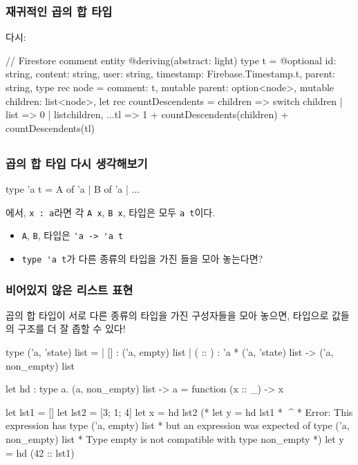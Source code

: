 \documentclass{beamer}
\begin{document}
\begin{frame}[c, fragile]
  \frametitle{재귀적인 곱의 합 타입}

  다시:
    \begin{ocamlcode}
  // Firestore comment entity
  @deriving({abstract: light})
  type t = {
    @optional id: string,
    content: string,
    user: string,
    timestamp: Firebase.Timestamp.t,
    parent: string,
  }
  type rec node = {
    comment: t,
    mutable parent: option<node>,
    mutable children: list<node>,
  }
  let rec countDescendents = children => {
    switch children {
    | list{} => 0
    | list{{children}, ...tl} => 1 + countDescendents(children) + countDescendents(tl)
    }
  }
    \end{ocamlcode}
\end{frame}


\subsection{}
\begin{frame}[c, fragile]
  \frametitle{곱의 합 타입 다시 생각해보기}

  \begin{ocamlcode}
    type 'a t = A of 'a | B of 'a | ...
  \end{ocamlcode}
  에서, \verb/x : a/라면 각 \verb/A x/, \verb/B x/,  타입은 모두 \verb/a t/이다.
  \begin{itemize}
    \pause\item \verb/A/, \verb/B/,  타입은 \verb/'a -> 'a t/
    \pause\item \verb/type 'a t/가 다른 종류의 타입을 가진 들을 모아 놓는다면?
  \end{itemize}
\end{frame}

\begin{frame}[c, fragile]
  \frametitle{비어있지 않은 리스트 표현}

  곱의 합 타입이 서로 다른 종류의 타입을 가진 구성자들을 모아 놓으면, 타입으로 값들의 구조를 더 잘 좁할 수 있다!
  \begin{ocamlcode}
type ('a, 'state) list =
| [] : ('a, empty) list
| ( :: ) : 'a * ('a, 'state) list -> ('a, non_empty) list

let hd : type a. (a, non_empty) list -> a = function (x :: _) -> x

let lst1 = []
let lst2 = [3; 1; 4]
let x = hd lst2
(* let y = hd lst1
 *            ^^^^
 * Error: This expression has type ('a, empty) list
 *        but an expression was expected of type ('a, non_empty) list
 *        Type empty is not compatible with type non_empty *)
let y = hd (42 :: lst1)
  \end{ocamlcode}
\end{frame}
\end{document}
